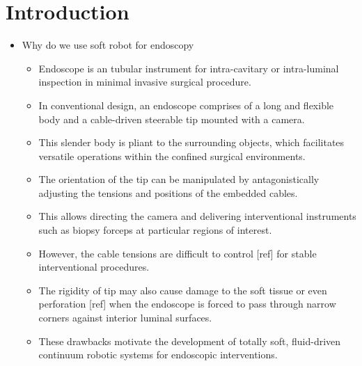 \documentclass[journal,onecolumn]{IEEEtran}
\begin{document}
\section{Introduction}
\label{sec:orgda1762c}
\begin{itemize}
\item Why do we use soft robot for endoscopy

\begin{itemize}
\item Endoscope is an tubular instrument for intra-cavitary or intra-luminal inspection in minimal invasive surgical procedure.

\item In conventional design, an endoscope comprises of a long and flexible body and a cable-driven steerable tip mounted with a camera.
\item This slender body is pliant to the surrounding objects, which facilitates versatile operations within the confined surgical environments.
\item The orientation of the tip can be manipulated by antagonistically adjusting the tensions and positions of the embedded cables.
\item This allows directing the camera and delivering interventional instruments such as biopsy forceps at particular regions of interest.

\item However, the cable tensions are difficult to control [ref] for stable interventional procedures.
\item The rigidity of tip may also cause damage to the soft tissue or even perforation [ref] when the endoscope is forced to pass through narrow corners against interior luminal surfaces.
\item These drawbacks motivate the development of totally soft, fluid-driven continuum robotic systems for endoscopic interventions.


\end{itemize}
\end{itemize}
\end{document}
